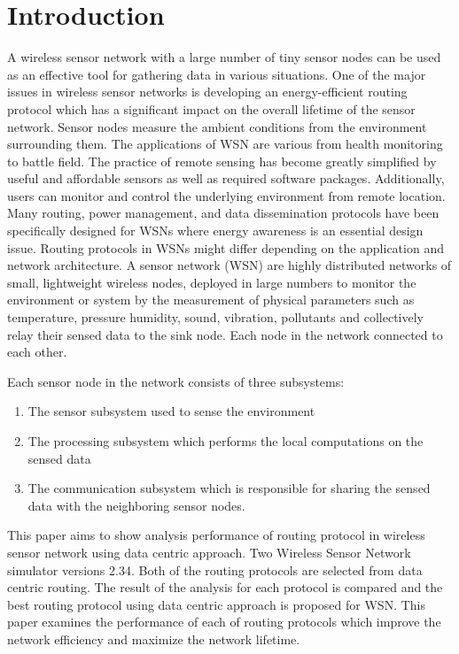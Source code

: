 \documentclass[journal,transmag]{IEEEtran}
\begin{document}
\IEEEdisplaynontitleabstractindextext

\IEEEpeerreviewmaketitle

\section{Introduction}

\IEEEPARstart
A wireless sensor network with a large number of tiny sensor nodes can be used as an effective tool for gathering data in various situations. One of the major issues in wireless sensor networks is developing an energy-efficient routing protocol which has a significant impact on the overall lifetime of the sensor network. Sensor nodes measure the ambient conditions from the environment surrounding them. The applications of WSN are various from health monitoring to battle field. The practice of remote sensing has become greatly simplified by useful and affordable sensors as well as required software packages. Additionally, users can monitor and control the underlying environment from remote location. Many routing, power management, and data dissemination protocols have been specifically designed for WSNs where energy awareness is an essential design issue. Routing protocols in WSNs might differ depending on the application and network architecture. A sensor network (WSN) are highly distributed networks of small, lightweight wireless nodes, deployed in large numbers to monitor the environment or system by the measurement of physical parameters such as temperature, pressure humidity, sound, vibration, pollutants and collectively relay their sensed data to the sink node. Each node in the network connected to each other.

Each sensor node in the network consists of three subsystems:

\begin{enumerate}
  \item The sensor subsystem used to sense the environment
  \item The processing subsystem which performs the local computations on the sensed data
  \item The communication subsystem which is responsible for sharing the sensed data with the neighboring sensor nodes.
\end{enumerate}

This paper aims to show analysis performance of routing protocol in wireless sensor network using data centric approach. Two Wireless Sensor Network simulator versions 2.34. Both of the routing protocols are selected from data centric routing. The result of the analysis for each protocol is compared and the best routing protocol using data centric approach is proposed for WSN. This paper examines the performance of each of routing protocols which improve the network efficiency and maximize the network lifetime.
\end{document}
